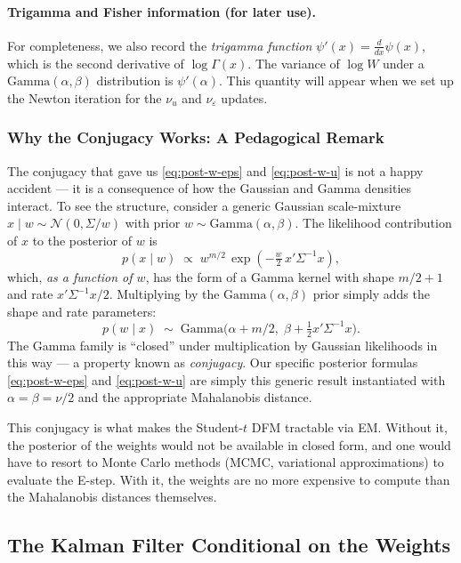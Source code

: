 \documentclass[11pt, a4paper, oneside]{article}
\begin{document}
\paragraph{Trigamma and Fisher information (for later use).}
For completeness, we also record the \emph{trigamma function}
$\psi'(x) = \frac{d}{dx}\psi(x)$, which is the second derivative of
$\log \Gamma(x)$. The variance of $\log W$ under a
$\mathrm{Gamma}(\alpha, \beta)$ distribution is $\psi'(\alpha)$. This
quantity will appear when we set up the Newton iteration for the
$\nu_u$ and $\nu_\varepsilon$ updates.

\subsubsection{Why the Conjugacy Works: A Pedagogical Remark}

The conjugacy that gave us \eqref{eq:post-w-eps} and
\eqref{eq:post-w-u} is not a happy accident — it is a consequence of
how the Gaussian and Gamma densities interact. To see the structure,
consider a generic Gaussian scale-mixture $x \mid w \sim \mathcal{N}(0, \Sigma/w)$
with prior $w \sim \mathrm{Gamma}(\alpha, \beta)$. The likelihood
contribution of $x$ to the posterior of $w$ is
\[
p(x \mid w) \;\propto\; w^{m/2}\, \exp(-\tfrac{w}{2}\, x'\Sigma^{-1} x),
\]
which, \emph{as a function of $w$}, has the form of a Gamma kernel
with shape $m/2 + 1$ and rate $x'\Sigma^{-1}x / 2$. Multiplying by the
$\mathrm{Gamma}(\alpha, \beta)$ prior simply adds the shape and rate
parameters:
\[
p(w \mid x) \;\sim\; \mathrm{Gamma}\!\big(\alpha + m/2,\; \beta + \tfrac{1}{2}x'\Sigma^{-1}x\big).
\]
The Gamma family is ``closed'' under multiplication by Gaussian
likelihoods in this way — a property known as \emph{conjugacy}. Our
specific posterior formulas \eqref{eq:post-w-eps} and
\eqref{eq:post-w-u} are simply this generic result instantiated with
$\alpha = \beta = \nu/2$ and the appropriate Mahalanobis distance.

This conjugacy is what makes the Student-$t$ DFM tractable via EM.
Without it, the posterior of the weights would not be available in
closed form, and one would have to resort to Monte Carlo methods
(MCMC, variational approximations) to evaluate the E-step. With it,
the weights are no more expensive to compute than the Mahalanobis
distances themselves.

\subsection{The Kalman Filter Conditional on the Weights}
\label{subsec:kalman-filter}
\end{document}
